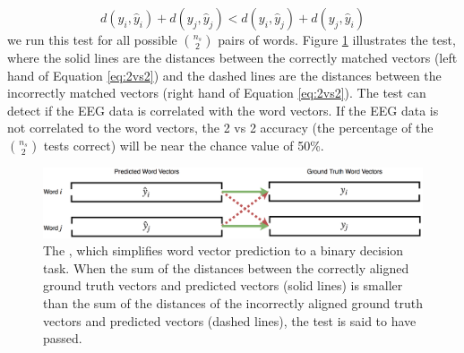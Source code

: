   \begin{equation}
    d(y_i, \hat{y}_i) + d(y_j, \hat{y}_j) < d(y_i, \hat{y}_j) + d(y_j, \hat{y}_i)
    \label{eq:2vs2}
  \end{equation}
\noindent we run this test for all possible ${\binom{n_s}{2}}$ pairs of words. Figure \ref{fig:2vs2} illustrates the \tvt test, where the solid lines are the distances between the correctly matched vectors (left hand of Equation \ref{eq:2vs2}) and the dashed lines are the distances between the incorrectly matched vectors (right hand of Equation \ref{eq:2vs2}). The \tvt test can detect if the EEG data is correlated with the word vectors. If the EEG data is not correlated to the word vectors, the 2 vs 2 accuracy (the percentage of the ${\binom{n_s}{2}}$ \tvt tests correct) will be  near the chance value of 50\%.

  \begin{figure}[t]
    \centering
    \includegraphics[width=\linewidth]{figures/2vs2}
    \caption{The \tvt, which simplifies word vector prediction to a binary decision task.  
   When the sum of the distances between the correctly aligned ground truth vectors and predicted vectors (solid lines) is smaller than the sum of the distances of the incorrectly aligned ground truth vectors and predicted vectors (dashed lines), the \tvt test is said to have passed.}
    \label{fig:2vs2}
  \end{figure}


